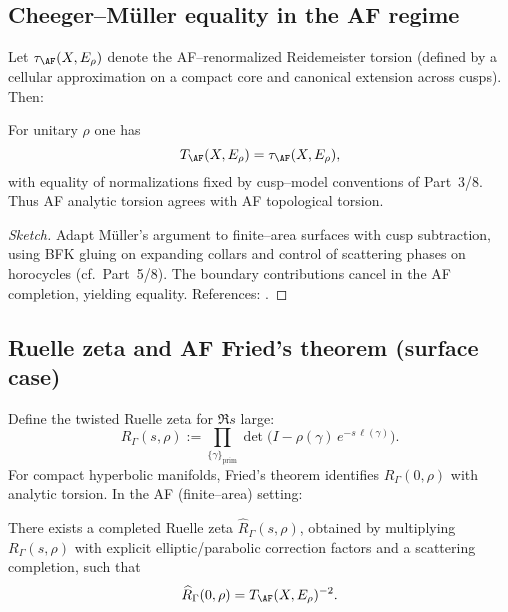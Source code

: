 \subsection{Cheeger–M\"uller equality in the AF regime}
\label{subsec:cheeger-mueller}
\relax\hspace{0pt}

Let $\tau_{\AF}(X,E_\rho)$ denote the AF–renormalized Reidemeister torsion (defined by a cellular approximation on a compact core and canonical extension across cusps). Then:

\begin{theorem}
\label{thm:AF-CM}
For unitary $\rho$ one has
\[
T_{\AF}(X,E_\rho)=\tau_{\AF}(X,E_\rho),
\]
with equality of normalizations fixed by cusp–model conventions of Part~3/8. Thus AF analytic torsion agrees with AF topological torsion.
\end{theorem}

\begin{proof}[Sketch]
Adapt M\"uller's argument to finite–area surfaces with cusp subtraction, using BFK gluing on expanding collars and control of scattering phases on horocycles (cf.\ Part~5/8). The boundary contributions cancel in the AF completion, yielding equality. References: \cite{Muller1992,BFK1992,Borthwick}. %
\end{proof}

\subsection{Ruelle zeta and AF Fried's theorem (surface case)}
\label{subsec:ruelle}
\relax\hspace{0pt}

Define the twisted Ruelle zeta for $\Re s$ large:
\begin{equation}\label{eq:ruelle}
R_\Gamma(s,\rho)
:= \prod_{\{\gamma\}_{\mathrm{prim}}}
\det\!\big( I - \rho(\gamma)\, e^{-s\,\ell(\gamma)} \big).
\end{equation}
For compact hyperbolic manifolds, Fried's theorem identifies $R_\Gamma(0,\rho)$ with analytic torsion. In the AF (finite–area) setting:

\begin{theorem}
\label{thm:AF-Fried}
There exists a completed Ruelle zeta $\widehat{R}_\Gamma(s,\rho)$, obtained by multiplying $R_\Gamma(s,\rho)$ with explicit elliptic/parabolic correction factors and a scattering completion, such that
\[
\widehat{R}_\Gamma(0,\rho)
= T_{\AF}(X,E_\rho)^{-2}.
\]
\end{theorem}

